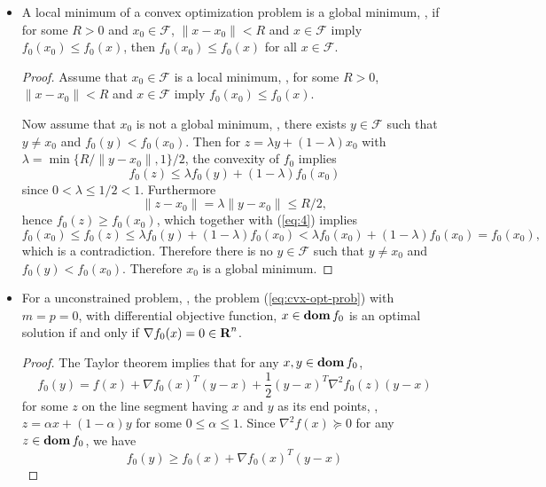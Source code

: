 \documentclass[11pt, oneside]{article}   	%
\newcommand{\feasibleset}{\mathcal{F}}
\newcommand{\grad}{\nabla}
\begin{document}
\begin{itemize}
\item A local minimum of a convex optimization problem is a global minimum,
\ie,
if for some $R>0$ and $x_0\in\feasibleset$, $\|x-x_0\|<R$ and $x\in\feasibleset$ imply $f_0(x_0) \leq f_0(x)$,
then $f_0(x_0) \leq f_0(x)$ for all $x\in\feasibleset$.
\begin{proof}
Assume that $x_0\in\feasibleset$ is a local minimum, \ie,
for some $R>0$, $\|x-x_0\|<R$ and $x\in\feasibleset$ imply $f_0(x_0) \leq f_0(x)$.

Now assume that $x_0$ is not a global minimum, \ie, there exists $y\in\feasibleset$
such that $y\neq x_0$ and $f_0(y) < f_0(x_0)$.
Then for $z = \lambda y + (1-\lambda) x_0$ with $\lambda = \min\{ R/\|y-x_0\|, 1\}/2$,
the convexity of $f_0$ implies
\begin{equation}
\label{eq:4}
f_0(z) \leq \lambda f_0(y) + (1-\lambda) f_0(x_0)
\end{equation}
since $0 < \lambda \leq 1/2 < 1$.
Furthermore
\begin{equation}
\|z - x_0\| = \lambda \|y-x_0\| \leq R/2,
\end{equation}
hence $f_0(z) \geq f_0(x_0)$, which together with (\ref{eq:4}) implies
\begin{equation}
f_0(x_0) \leq f_0(z)
\leq \lambda f_0(y) + (1-\lambda) f_0(x_0)
< \lambda f_0(x_0) + (1-\lambda) f_0(x_0)
= f_0(x_0),
\end{equation}
which is a contradiction.
Therefore there is no $y\in\feasibleset$ such that $y\neq x_0$ and $f_0(y) < f_0(x_0)$.
Therefore $x_0$ is a global minimum.
\end{proof}



\item For a unconstrained problem, \ie, the problem (\ref{eq:cvx-opt-prob}) with $m=p=0$, with differential objective function,
$x\in\mathop{\bf dom} f_0$ is an optimal solution if and only if $\grad f_0(x)= 0 \in \reals^n$.

\begin{proof}
The Taylor theorem implies that for any $x,y\in\mathop{\bf dom} f_0$,
\begin{equation}
\label{eq:second-order-taylor}
f_0(y) = f(x) + \grad f_0(x) ^T (y-x) + \frac{1}{2} (y-x)^T \grad^2 f_0(z) (y-x)
\end{equation}
for some $z$ on the line segment having $x$ and $y$ as its end points,
\ie, $z = \alpha x + (1-\alpha) y$ for some $0\leq \alpha \leq 1$.
Since $\grad^2 f(x) \succeq0$ for any $z \in \mathop{\bf dom} f_0$, we have
\begin{equation}
f_0(y) \geq f_0(x) + \grad f_0(x) ^T (y-x)
\end{equation}


\end{proof}
\end{itemize}
\end{document}
